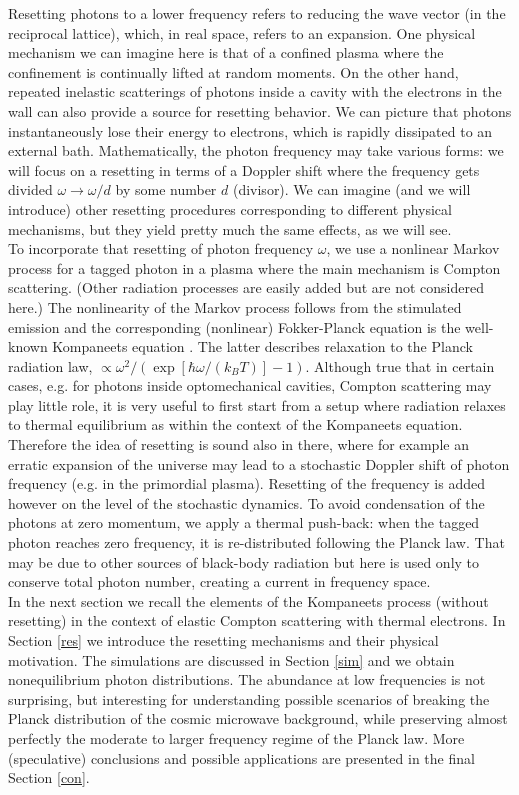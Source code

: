 \documentclass[a4paper,12pt,reqno,superscriptaddress,nofootinbib]{revtex4}
\theoremstyle{plain}
\theoremstyle{definition}
\theoremstyle{remark}
\newcommand{\0}{^{(0)}}
\newcommand{\1}{^{(1)}}
\newcommand{\2}{^{(2)}}
\begin{document}
Resetting photons to a lower frequency refers to reducing the wave vector (in the reciprocal lattice), which, in real space, refers to an expansion. One physical mechanism we can imagine here is that of a confined plasma where the confinement is continually lifted at random moments. On the other hand, repeated inelastic scatterings of photons inside a cavity with the electrons in the wall can also provide a source for resetting behavior. We can picture that photons instantaneously lose their energy to electrons, which is rapidly dissipated to an external bath. 
Mathematically, the photon frequency may take various forms: we will focus on a resetting in terms of a Doppler shift where the frequency gets divided $\omega \rightarrow \omega/d$ by some number $d$ (divisor).  We can imagine (and we will introduce) other resetting procedures corresponding to different physical mechanisms, but they yield pretty much the same effects, as we will see.\\
To incorporate that resetting of photon frequency  $\omega$, we use a nonlinear Markov process for a tagged photon in a plasma where the main mechanism is Compton scattering. (Other radiation processes are easily added but are not considered here.)  The nonlinearity of the Markov process follows from the stimulated emission and the corresponding (nonlinear) Fokker-Planck equation is the well-known Kompaneets equation \cite{kompa}.  The latter describes relaxation to the Planck radiation law, $\propto \omega^2 / (\exp[\hbar\omega/(k_BT)]-1)$. Although true that in certain cases, e.g. for photons inside optomechanical cavities, Compton scattering may play little role, it is very useful to first start from a setup where radiation relaxes to thermal equilibrium as within the context of the Kompaneets equation. Therefore the idea of resetting is sound also in there, where for example an erratic expansion of the universe may lead to a stochastic Doppler shift of photon frequency (e.g. in the primordial plasma). Resetting of the frequency is added however on the level of the stochastic dynamics.  To avoid condensation of the photons at zero momentum, we apply a thermal push-back: when the tagged photon reaches zero frequency, it is re-distributed following the Planck law. That may be due to other sources of black-body radiation but here is used only to conserve total photon number, creating a current in frequency space.\\

In the next section we recall the elements of the Kompaneets process (without resetting) in the context of elastic Compton scattering with thermal electrons.  In Section \ref{res} we introduce the resetting mechanisms and their physical motivation.  The simulations are discussed in Section \ref{sim} and we obtain nonequilibrium photon distributions.  The abundance at low frequencies is not surprising, but interesting for understanding possible scenarios of breaking the Planck distribution of the cosmic microwave background, while preserving almost perfectly the moderate to larger frequency regime of the Planck law.  More (speculative) conclusions and possible applications are presented in the final Section \ref{con}. 
\end{document}
